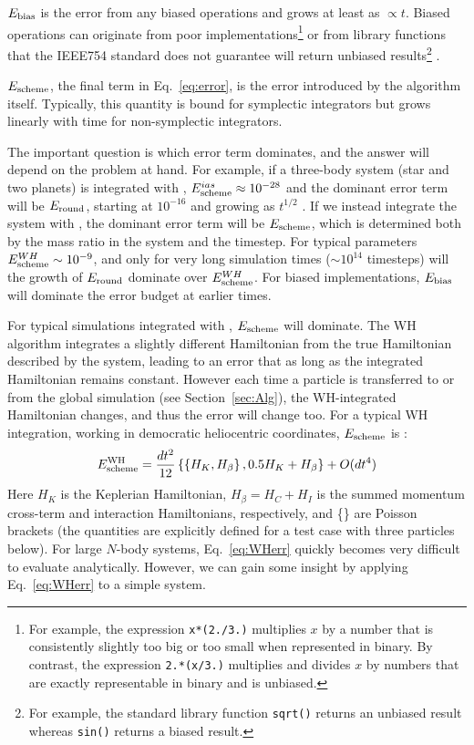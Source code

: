 $E_{\rm bias}$ is the error from any biased operations and grows at least as $\propto t$.
Biased operations can originate from poor implementations\footnote{For example, the expression \texttt{x*(2./3.)} multiplies $x$ by a number that is consistently slightly too big or too small when represented in binary.  By contrast, the expression \texttt{2.*(x/3.)} multiplies and divides $x$ by numbers that are exactly representable in binary and is unbiased.} or from library functions that the IEEE754 standard does not guarantee will return unbiased results\footnote{For example, the standard library function \texttt{sqrt()} returns an unbiased result whereas \texttt{sin()} returns a biased result.} .

$E_{\rm scheme}$, the final term in Eq.~\ref{eq:error}, is the error introduced by the algorithm itself. 
Typically, this quantity is bound for symplectic integrators but grows linearly with time for non-symplectic integrators.

The important question is which error term dominates, and the answer will depend on the problem at hand.
For example, if a three-body system (star and two planets) is integrated with \ias, $E_{\rm scheme}^{ias} \approx 10^{-28}$ and the dominant error term will be $E_{\rm round}$, starting at $10^{-16}$ and growing as $t^{1/2}$ \citep[see][]{Rein2015a}. 
If we instead integrate the system with \whfast, the dominant error term will be $E_{\rm scheme}$, which is determined both by the mass ratio in the system and the timestep. 
For typical parameters $E^{WH}_{\rm scheme} \sim 10^{-9}$, and only for very long simulation times ($\sim 10^{14}$ timesteps) will the growth of $E_{\rm round}$ dominate over $E^{WH}_{\rm scheme}$.
For biased implementations, $E_{\rm bias}$ will dominate the error budget at earlier times.  

For typical simulations integrated with \hermes, $E_{\rm scheme}$ will dominate. 
The WH algorithm integrates a slightly different Hamiltonian from the true Hamiltonian described by the system, leading to an error that  as long as the integrated Hamiltonian remains constant.
However each time a particle is transferred to or from the global simulation (see Section~\ref{sec:Alg}), the WH-integrated Hamiltonian changes, and thus the error will change too.
For a typical WH integration, working in democratic heliocentric coordinates, $E_{\rm scheme}$ is \citep[e.g.][]{Saha1994,Wisdom2006}:
\begin{equation}
E_{\rm scheme}^{\rm WH} = \frac{dt^2}{12} \left \{ \left \{H_K, H_{\beta} \right \},  0.5H_K + H_{\beta} \right \} + O(dt^4)
\label{eq:WHerr}
\end{equation}
Here $H_K$ is the Keplerian Hamiltonian, $H_{\beta} = H_C + H_I$ is the summed momentum cross-term and interaction Hamiltonians, respectively, and \{\} are Poisson brackets (the quantities are explicitly defined for a test case with three particles below). 
For large $N$-body systems, Eq.~\ref{eq:WHerr} quickly becomes very difficult to evaluate analytically. 
However, we can gain some insight by applying Eq.~\ref{eq:WHerr} to a simple system. 

